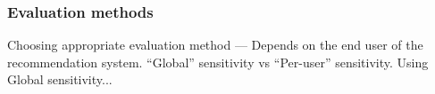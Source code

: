 \documentclass[handout]{beamer}
\begin{document}
\begin{frame}
\frametitle{Evaluation methods}
\begin{itemize}
\pitem Choosing appropriate evaluation method --- Depends on the end user of the recommendation system.
\pitem ``Global'' sensitivity vs ``Per-user'' sensitivity.
\pitem Using Global sensitivity...
\pause
\begin{figure}[h]
  \begin{center}
  \end{center}
\end{figure}
\end{itemize}
\end{frame}
\end{document}
